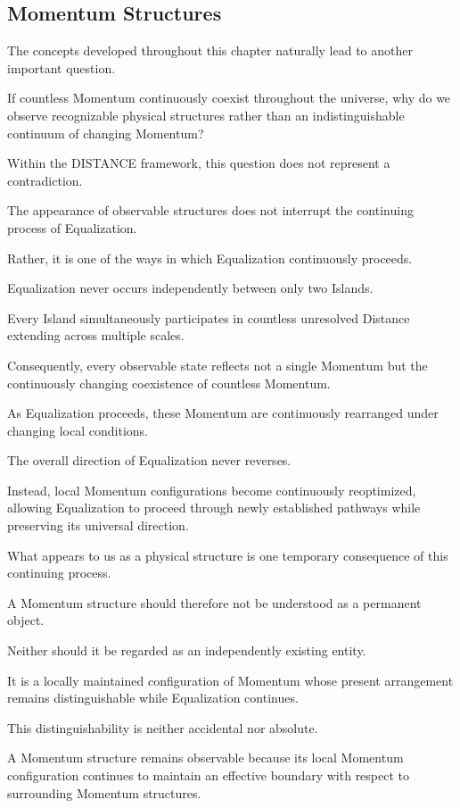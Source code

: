 \subsection*{\textbf{Momentum Structures}}

The concepts developed throughout this chapter naturally lead to another important question.

If countless Momentum continuously coexist throughout the universe, why do we observe recognizable physical structures rather than an indistinguishable continuum of changing Momentum?

Within the DISTANCE framework, this question does not represent a contradiction.

The appearance of observable structures does not interrupt the continuing process of Equalization.

Rather, it is one of the ways in which Equalization continuously proceeds.

Equalization never occurs independently between only two Islands.

Every Island simultaneously participates in countless unresolved Distance extending across multiple scales.

Consequently, every observable state reflects not a single Momentum but the continuously changing coexistence of countless Momentum.

As Equalization proceeds, these Momentum are continuously rearranged under changing local conditions.

The overall direction of Equalization never reverses.

Instead, local Momentum configurations become continuously reoptimized, allowing Equalization to proceed through newly established pathways while preserving its universal direction.

What appears to us as a physical structure is one temporary consequence of this continuing process.

A Momentum structure should therefore not be understood as a permanent object.

Neither should it be regarded as an independently existing entity.

It is a locally maintained configuration of Momentum whose present arrangement remains distinguishable while Equalization continues.

This distinguishability is neither accidental nor absolute.

A Momentum structure remains observable because its local Momentum configuration continues to maintain an effective boundary with respect to surrounding Momentum structures.

